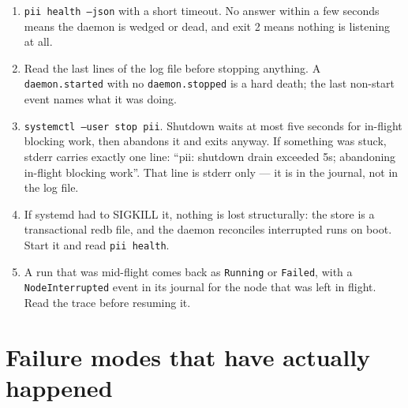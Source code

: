 \begin{enumerate}
	\item \texttt{pii health --json} with a short timeout. No answer within a few seconds
	means the daemon is wedged or dead, and exit 2 means nothing is listening at all.
	\item Read the last lines of the log file before stopping anything. A
	\texttt{daemon.started} with no \texttt{daemon.stopped} is a hard death; the last
	non-start event names what it was doing.
	\item \texttt{systemctl --user stop pii}. Shutdown waits at most five seconds for
	in-flight blocking work, then abandons it and exits anyway. If something was stuck,
	stderr carries exactly one line:
	\enquote{pii: shutdown drain exceeded 5s; abandoning in-flight blocking work}. That
	line is stderr only --- it is in the journal, not in the log file.
	\item If systemd had to SIGKILL it, nothing is lost structurally: the store is a
	transactional redb file, and the daemon reconciles interrupted runs on boot. Start it
	and read \texttt{pii health}.
	\item A run that was mid-flight comes back as \texttt{Running} or \texttt{Failed}, with
	a \texttt{NodeInterrupted} event in its journal for the node that was left in flight.
	Read the trace before resuming it.
\end{enumerate}

\section{Failure modes that have actually happened}

